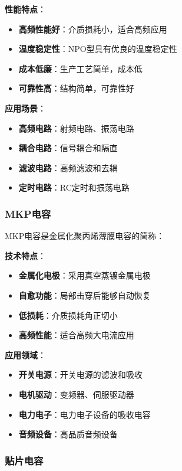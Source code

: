\documentclass[12pt,UTF8]{ctexbook}
\begin{document}
\textbf{性能特点}：
\begin{itemize}[leftmargin=3.5em]
	\item \textbf{高频性能好}：介质损耗小，适合高频应用
	\item \textbf{温度稳定性}：NPO型具有优良的温度稳定性
	\item \textbf{成本低廉}：生产工艺简单，成本低
	\item \textbf{可靠性高}：结构简单，可靠性好
\end{itemize}

\textbf{应用场景}：
\begin{itemize}[leftmargin=3.5em]
	\item \textbf{高频电路}：射频电路、振荡电路
	\item \textbf{耦合电路}：信号耦合和隔直
	\item \textbf{滤波电路}：高频滤波和去耦
	\item \textbf{定时电路}：RC定时和振荡电路
\end{itemize}

\subsubsection{MKP电容}

MKP电容是金属化聚丙烯薄膜电容的简称：

\textbf{技术特点}：
\begin{itemize}[leftmargin=3.5em]
	\item \textbf{金属化电极}：采用真空蒸镀金属电极
	\item \textbf{自愈功能}：局部击穿后能够自动恢复
	\item \textbf{低损耗}：介质损耗角正切小
	\item \textbf{高频性能}：适合高频大电流应用
\end{itemize}

\textbf{应用领域}：
\begin{itemize}[leftmargin=3.5em]
	\item \textbf{开关电源}：开关电源的滤波和吸收
	\item \textbf{电机驱动}：变频器、伺服驱动器
	\item \textbf{电力电子}：电力电子设备的吸收电容
	\item \textbf{音频设备}：高品质音频设备
\end{itemize}

\subsubsection{贴片电容}
\end{document}
